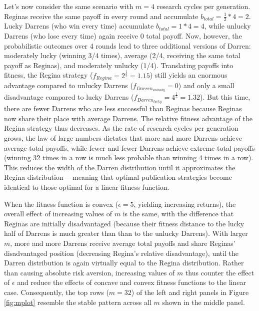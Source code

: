 \documentclass[
  ,man,mask,floatsintext]{apa6}
\begin{document}
Let's now consider the same scenario with \(m = 4\) research cycles per generation.
Reginas receive the same payoff in every round and accumulate \(b_{total} = \frac{1}{2} * 4 = 2\).
Lucky Darrens (who win every time) accumulate \(b_{total} = 1*4 = 4\), while unlucky Darrens (who lose every time) again receive 0 total payoff.
Now, however, the probabilistic outcomes over 4 rounds lead to three additional versions of Darren: moderately lucky (winning 3/4 times), average (2/4, receiving the same total payoff as Reginas), and moderately unlucky (1/4).
Translating payoffs into fitness, the Regina strategy (\(f_{Regina} = 2^\frac{1}{5} = 1.15\)) still yields an enormous advantage compared to unlucky Darrens (\(f_{Darren_{unlucky}} = 0\)) and only a small disadvantage compared to lucky Darrens (\(f_{Darren_{lucky}} = 4^\frac{1}{5} = 1.32\)).
But this time, there are fewer Darrens who are less successful than Reginas because Reginas now share their place with average Darrens.
The relative fitness advantage of the Regina strategy thus decreases.
As the rate of research cycles per generation grows, the law of large numbers dictates that more and more Darrens achieve average total payoffs, while fewer and fewer Darrens achieve extreme total payoffs (winning 32 times in a row is much less probable than winning 4 times in a row).
This reduces the width of the Darren distribution until it approximates the Regina distribution\(\,\)---\(\,\)meaning that optimal publication strategies become identical to those optimal for a linear fitness function.

When the fitness function is convex (\(\epsilon = 5\), yielding increasing returns), the overall effect of increasing values of \(m\) is the same, with the difference that Reginas are initially disadvantaged (because their fitness distance to the lucky half of Darrens is much greater than than to the unlucky Darrens).
With larger \(m\), more and more Darrens receive average total payoffs and share Reginas' disadvantaged position (decreasing Regina's relative disadvantage), until the Darren distribution is again virtually equal to the Regina distribution.
Rather than causing absolute risk aversion, increasing values of \(m\) thus counter the effect of \(\epsilon\) and reduce the effects of concave and convex fitness functions to the linear case.
Consequently, the top rows (\(m = 32\)) of the left and right panels in Figure \ref{fig:mplot} resemble the stable pattern across all \(m\) shown in the middle panel.
\end{document}
